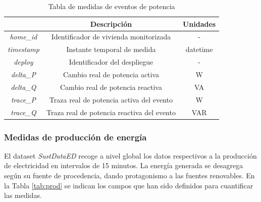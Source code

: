 \vspace{3mm}

\begin{table}[h!]
    \centering
    \begin{tabular}{|c|c|c|}
    \hline
    \rowcolor[HTML]{AAAAAA} 
    \multicolumn{1}{|c|}{\cellcolor[HTML]{AAAAAA}Campo} & \multicolumn{1}{c|}{\cellcolor[HTML]{AAAAAA}Descripción} & Unidades \\ \hline
    \textit{home\_id} & Identificador de vivienda monitorizada & - \\ \hline
    \textit{timestamp} & Instante temporal de medida & datetime \\ \hline
    \textit{deploy} & Identificador del despliegue & - \\ \hline
    \textit{delta\_P} & Cambio real de potencia activa & W \\ \hline
    \textit{delta\_Q} & Cambio real de potencia reactiva & VA \\ \hline
    \textit{trace\_P} & Traza real de potencia activa del evento & W \\ \hline
    \textit{trace\_Q} & Traza real de potencia reactiva del evento & VAR \\ \hline
    \end{tabular}
    \caption{Tabla de medidas de eventos de potencia \cite{sustdata}}
    \label{tab:eventos}
\end{table}

\clearpage

\subsubsection{Medidas de producción de energía}
\label{sec:prodsustdata}

El dataset \textit{SustDataED} recoge a nivel global los datos respectivos a la producción de electricidad en intervalos de 15 minutos. La energía generada se desagrega según su fuente de procedencia, dando protagonismo a las fuentes renovables. En la Tabla \ref{tab:prod} se indican los campos que han sido definidos para cuantificar las medidas.

\vspace{3mm}

